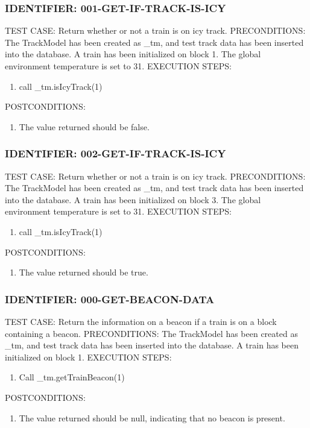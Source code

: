 \documentclass{scrreprt}
\begin{document}
\subsubsection{IDENTIFIER: 001-GET-IF-TRACK-IS-ICY}
TEST CASE: Return whether or not a train is on icy track.
PRECONDITIONS: The TrackModel has been created as _tm, and test track data has been inserted into the database. A train has been initialized on block 1. The global environment temperature is set to 31.
EXECUTION STEPS:
\begin{enumerate}
	\item call _tm.isIcyTrack(1)
\end{enumerate}
POSTCONDITIONS:
\begin{enumerate}
	\item The value returned should be false.
\end{enumerate}

\subsubsection{IDENTIFIER: 002-GET-IF-TRACK-IS-ICY}
TEST CASE: Return whether or not a train is on icy track.
PRECONDITIONS: The TrackModel has been created as _tm, and test track data has been inserted into the database. A train has been initialized on block 3. The global environment temperature is set to 31.
EXECUTION STEPS:
\begin{enumerate}
	\item call _tm.isIcyTrack(1)
\end{enumerate}
POSTCONDITIONS:
\begin{enumerate}
	\item The value returned should be true.
\end{enumerate}

\subsubsection{IDENTIFIER: 000-GET-BEACON-DATA}
TEST CASE: Return the information on a beacon if a train is on a block containing a beacon.
PRECONDITIONS: The TrackModel has been created as _tm, and test track data has been inserted into the database. A train has been initialized on block 1.
EXECUTION STEPS:
\begin{enumerate}
	\item Call _tm.getTrainBeacon(1)
\end{enumerate}
POSTCONDITIONS:
\begin{enumerate}
	\item The value returned should be null, indicating that no beacon is present.
\end{enumerate}
\end{document}
